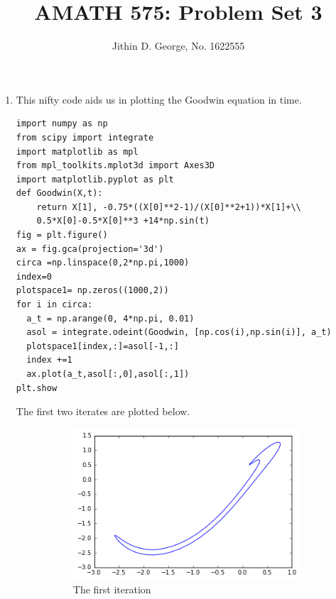 \documentclass[a4paper,11pt]{article}
\title{AMATH 575: Problem Set 3}
\author{Jithin D. George, No. 1622555}
\begin{document}
\maketitle
\begin{enumerate}

	

	\item
	This nifty code aids us in plotting the Goodwin equation in time.
	\begin{lstlisting}[style=MyPythonstyle]
import numpy as np
from scipy import integrate
import matplotlib as mpl
from mpl_toolkits.mplot3d import Axes3D
import matplotlib.pyplot as plt
def Goodwin(X,t):
	return X[1], -0.75*((X[0]**2-1)/(X[0]**2+1))*X[1]+\\
	0.5*X[0]-0.5*X[0]**3 +14*np.sin(t)
fig = plt.figure()
ax = fig.gca(projection='3d')
circa =np.linspace(0,2*np.pi,1000)
index=0
plotspace1= np.zeros((1000,2))
for i in circa:
  a_t = np.arange(0, 4*np.pi, 0.01)
  asol = integrate.odeint(Goodwin, [np.cos(i),np.sin(i)], a_t)
  plotspace1[index,:]=asol[-1,:]
  index +=1    
  ax.plot(a_t,asol[:,0],asol[:,1])
plt.show
	\end{lstlisting}
The first two iterates are plotted below.
\begin{figure}[H]
	\centering
	\begin{subfigure}{.5\textwidth}
		\centering
		\includegraphics[width=\linewidth]{firstiter}
		\caption{The first iteration}
		\label{fig:sub1}
	\end{subfigure}%
	\begin{subfigure}{.5\textwidth}
		\centering

\end{subfigure}
\end{figure}
\end{enumerate}
\end{document}
